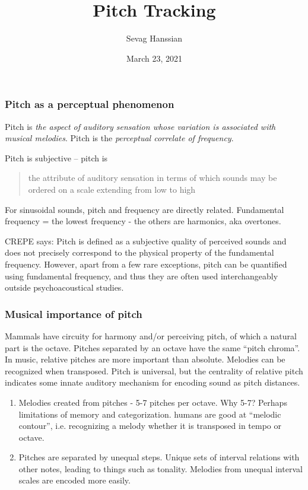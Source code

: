 \documentclass{beamer}
\title{Pitch Tracking}
\author{Sevag Hanssian}
\date{March 23, 2021}
\institute{MUMT 621, Winter 2021}
\begin{document}
\begin{frame}
\maketitle
\end{frame}

\begin{frame}
	\frametitle{Pitch as a perceptual phenomenon}

Pitch is \textit{the aspect of auditory sensation whose variation is associated with musical melodies}. Pitch is the \textit{perceptual correlate of frequency}.

Pitch is subjective -- pitch is
\begin{quote}
	the attribute of auditory sensation in terms of which sounds may be ordered on a scale extending from low to high
\end{quote}

For sinusoidal sounds, pitch and frequency are directly related. Fundamental frequency = the lowest frequency - the others are harmonics, aka overtones.

CREPE says:
Pitch is defined as a subjective quality of perceived sounds and does not precisely correspond to the physical property of the fundamental  frequency. However,  apart  from  a  few  rare  exceptions, pitch can be quantified using fundamental frequency, and thus they are often used interchangeably outside psychoacoustical studies.
\end{frame}


\begin{frame}
	\frametitle{Musical importance of pitch}
	Mammals have circuity for harmony and/or perceiving pitch, of which a natural part is the octave. Pitches separated by an octave have the same ``pitch chroma''. In music, relative pitches are more important than absolute. Melodies can be recognized when transposed. Pitch is universal, but the centrality of relative pitch indicates some innate auditory mechanism for encoding sound as pitch distances.
\begin{enumerate}
	\item
		Melodies created from pitches - 5-7 pitches per octave. Why 5-7? Perhaps limitations of memory and categorization. humans are good at ``melodic contour'', i.e. recognizing a melody whether it is transposed in tempo or octave.
	\item
		Pitches are separated by unequal steps. Unique sets of interval relations with other notes, leading to things such as tonality. Melodies from unequal interval scales are encoded more easily.
\end{enumerate}
\end{frame}
\end{document}
